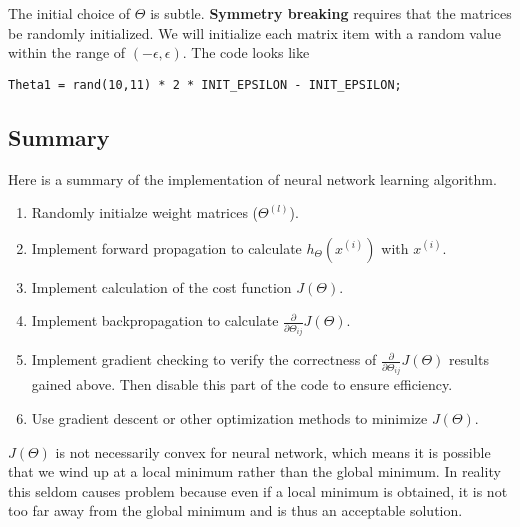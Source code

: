 The initial choice of $\Theta$ is subtle. {\bf Symmetry breaking} requires that the matrices be randomly initialized. We will initialize each matrix item with a random value within the range of $(-\epsilon, \epsilon)$. The code looks like
\begin{lstlisting}
Theta1 = rand(10,11) * 2 * INIT_EPSILON - INIT_EPSILON;
\end{lstlisting}
\subsection{Summary}
Here is a summary of the implementation of neural network learning algorithm.
\begin{enumerate}
\item Randomly initialze weight matrices ($\Theta^{(l)}$).
\item Implement forward propagation to calculate $h_{\Theta}(x^{(i)})$ with $x^{(i)}$.
\item Implement calculation of the cost function $J(\Theta)$.
\item Implement backpropagation to calculate $\frac{\partial}{\partial \Theta_{ij}}J(\Theta)$.
\item Implement gradient checking to verify the correctness of $\frac{\partial}{\partial \Theta_{ij}}J(\Theta)$ results gained above. Then disable this part of the code to ensure efficiency.
\item Use gradient descent or other optimization methods to minimize $J(\Theta)$.
\end{enumerate}

$J(\Theta)$ is not necessarily convex for neural network, which means it is possible that we wind up at a local minimum rather than the global minimum. In reality this seldom causes problem because even if a local minimum is obtained, it is not too far away from the global minimum and is thus an acceptable solution.
\ifx\PREAMBLE\undefined

\fi